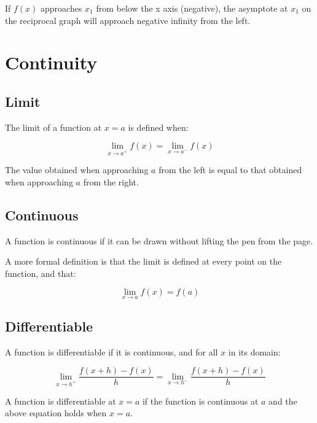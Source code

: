 \documentclass[a4paper,11pt]{article}
\begin{document}
If $f(x)$ approaches $x_1$ from below the x axis (negative), the asymptote at
$x_1$ on the reciprocal graph will approach negative infinity from the left.




\section{Continuity}

\subsection{Limit}

The limit of a function at $x = a$ is defined when:

$$
\lim_{x \to a^+} f(x) = \lim_{x \to a^-} f(x)
$$

The value obtained when approaching $a$ from the left is equal to that obtained
when approaching $a$ from the right.


\subsection{Continuous}

A function is continuous if it can be drawn without lifting the pen from the
page.

A more formal definition is that the limit is defined at every point on the
function, and that:

$$
\lim_{x \to a} f(x) = f(a)
$$


\subsection{Differentiable}

A function is differentiable if it is continuous, and for all $x$ in its domain:

$$
\lim_{x \to h^+} \frac{f(x + h) - f(x)}{h} = \lim_{x \to h^-} \frac{f(x + h) - f(x)}{h}
$$

A function is differentiable at $x = a$ if the function is continuous at $a$
and the above equation holds when $x = a$.
\end{document}
